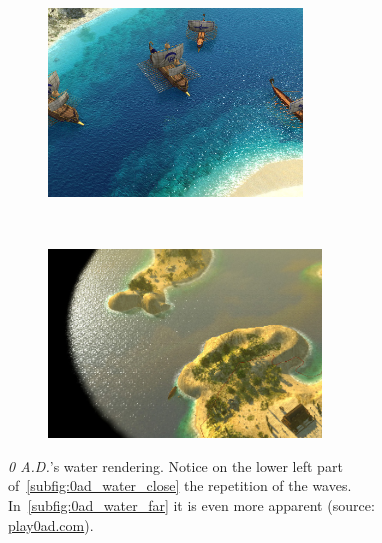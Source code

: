 
\begin{figure}[t!]
    \centering
    \begin{subfigure}[t]{\textwidth}
        \centering
        \includegraphics[height=5cm]{figures/0ad_water-specular.jpg}
        \label{subfig:0ad_water_close}
    \end{subfigure}\\%
    \begin{subfigure}[t]{\textwidth}
        \centering
        \includegraphics[height=5cm]{figures/0ad_cycladic_arcgipelago_6.jpg}
        \label{subfig:0ad_water_far}
    \end{subfigure}
    \caption{\textit{0 A.D.}'s water rendering. Notice on the lower left part
        of~\autoref{subfig:0ad_water_close} the repetition of the waves.
        In~\autoref{subfig:0ad_water_far} it is even more apparent (source:
        \url{play0ad.com}).}\label{fig:0ad_water}
\end{figure}

